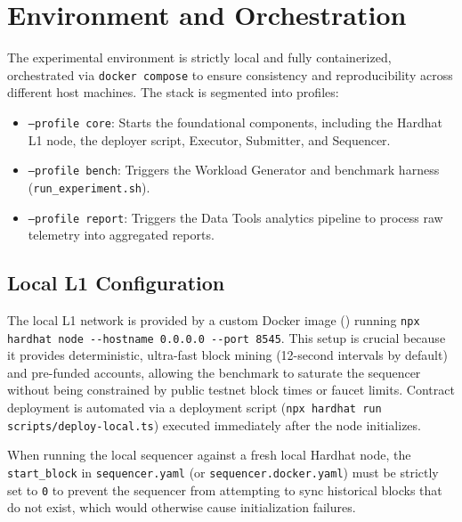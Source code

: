 \section{Environment and Orchestration}
\label{sec:environment}
The experimental environment is strictly local and fully containerized, orchestrated via \texttt{docker compose} to ensure consistency and reproducibility across different host machines. The stack is segmented into profiles:
\begin{itemize}
    \item \texttt{--profile core}: Starts the foundational components, including the Hardhat L1 node, the deployer script, Executor, Submitter, and Sequencer.
    \item \texttt{--profile bench}: Triggers the Workload Generator and benchmark harness (\texttt{run\_experiment.sh}).
    \item \texttt{--profile report}: Triggers the Data Tools analytics pipeline to process raw telemetry into aggregated reports.
\end{itemize}

\subsection{Local L1 Configuration}
The local L1 network is provided by a custom Docker image () running \texttt{npx hardhat node -{}-hostname 0.0.0.0 -{}-port 8545}. This setup is crucial because it provides deterministic, ultra-fast block mining (12-second intervals by default) and pre-funded accounts, allowing the benchmark to saturate the sequencer without being constrained by public testnet block times or faucet limits. Contract deployment is automated via a deployment script (\texttt{npx hardhat run scripts/deploy-local.ts}) executed immediately after the node initializes.

When running the local sequencer against a fresh local Hardhat node, the \texttt{start\_block} in \texttt{sequencer.yaml} (or \texttt{sequencer.docker.yaml}) must be strictly set to \texttt{0} to prevent the sequencer from attempting to sync historical blocks that do not exist, which would otherwise cause initialization failures.